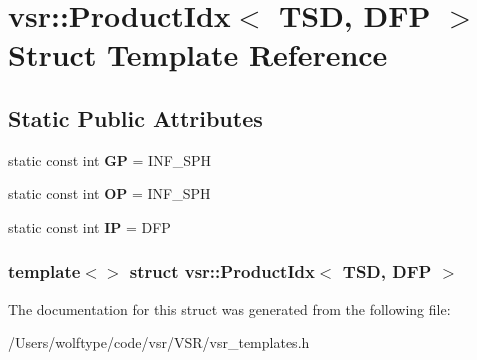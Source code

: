 \hypertarget{structvsr_1_1_product_idx_3_01_t_s_d_00_01_d_f_p_01_4}{\section{vsr\-:\-:Product\-Idx$<$ T\-S\-D, D\-F\-P $>$ Struct Template Reference}
\label{structvsr_1_1_product_idx_3_01_t_s_d_00_01_d_f_p_01_4}
}
\subsection*{Static Public Attributes}
\begin{DoxyCompactItemize}
\item 
\hypertarget{structvsr_1_1_product_idx_3_01_t_s_d_00_01_d_f_p_01_4_ade5d403d693fd3f16ba8507822ed4a5c}{static const int {\bfseries G\-P} = I\-N\-F\-\_\-\-S\-P\-H}\label{structvsr_1_1_product_idx_3_01_t_s_d_00_01_d_f_p_01_4_ade5d403d693fd3f16ba8507822ed4a5c}

\item 
\hypertarget{structvsr_1_1_product_idx_3_01_t_s_d_00_01_d_f_p_01_4_a2d552acefe4a1ae782584278d781cb67}{static const int {\bfseries O\-P} = I\-N\-F\-\_\-\-S\-P\-H}\label{structvsr_1_1_product_idx_3_01_t_s_d_00_01_d_f_p_01_4_a2d552acefe4a1ae782584278d781cb67}

\item 
\hypertarget{structvsr_1_1_product_idx_3_01_t_s_d_00_01_d_f_p_01_4_abd6ca06e2a8f09c468a50ae902ec7cc2}{static const int {\bfseries I\-P} = D\-F\-P}\label{structvsr_1_1_product_idx_3_01_t_s_d_00_01_d_f_p_01_4_abd6ca06e2a8f09c468a50ae902ec7cc2}

\end{DoxyCompactItemize}
\subsubsection*{template$<$$>$ struct vsr\-::\-Product\-Idx$<$ T\-S\-D, D\-F\-P $>$}



The documentation for this struct was generated from the following file\-:\begin{DoxyCompactItemize}
\item 
/\-Users/wolftype/code/vsr/\-V\-S\-R/vsr\-\_\-templates.\-h\end{DoxyCompactItemize}
